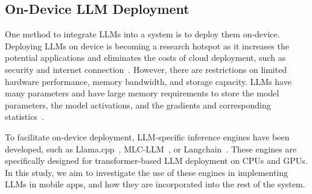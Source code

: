 

 

\subsection{On-Device LLM Deployment}

One method to integrate LLMs into a system is to deploy them on-device. Deploying LLMs on device is becoming a research hotspot as it increases the potential applications and eliminates the costs of cloud deployment, such as security and internet connection~\cite{naveed2023comprehensive}. However, there are restrictions on  limited hardware performance, memory bandwidth, and storage capacity. LLMs have many parameters and have large memory requirements to store the model parameters, the model activations, and the gradients and corresponding statistics~\cite{naveed2023comprehensive}.


To facilitate on-device deployment, LLM-specific inference engines have been developed, such as  Llama.cpp~\cite{llamacpp}, MLC-LLM~\cite{mlcllm}, or Langchain~\cite{langchain}. These engines are specifically designed for transformer-based LLM deployment on CPUs and GPUs. 
In this study, we aim to investigate the use of these engines in implementing LLMs in mobile apps, and how they are incorporated into the rest of the system.

